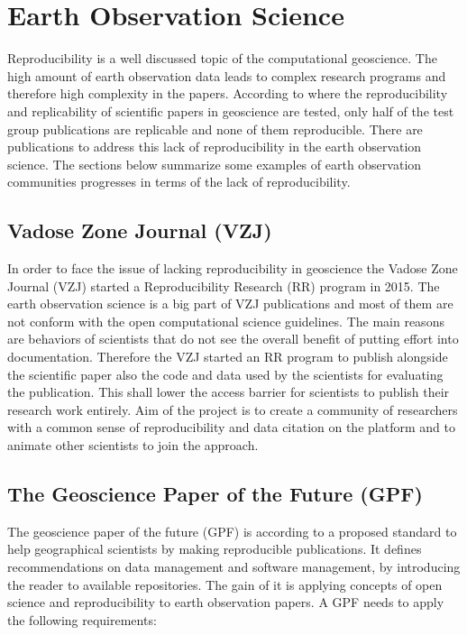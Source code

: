 \documentclass[draft,final]{vutinfth} %
\begin{document}
\section{Earth Observation Science}\label{EOScience}

Reproducibility is a well discussed topic of the computational geoscience. The high amount of earth observation data leads to complex research programs and therefore high complexity in the papers.  According to \cite{Ostermann2017AdvancingSW} where the reproducibility and replicability of scientific papers in geoscience are tested, only half of the test group publications are replicable and none of them reproducible. There are publications to address this lack of reproducibility in the earth observation science. The sections below summarize some examples of earth observation communities progresses in terms of the lack of reproducibility. 

\subsection{Vadose Zone Journal (VZJ)}\label{VZJ}
In order to face the issue of lacking reproducibility in geoscience the Vadose Zone Journal (VZJ) started a Reproducibility Research (RR) program in 2015. \cite{doi:10.2136/vzj2015.06.0088}
The earth observation science is a big part of VZJ publications and most of them are not conform with the open computational science guidelines. The main reasons are behaviors of scientists that do not see the overall benefit of putting effort into documentation. Therefore the VZJ started an RR program to publish alongside the scientific paper also the code and data used by the scientists for evaluating the publication. This shall lower the access barrier for scientists to publish their research work entirely. Aim of the project is to create a community of researchers with a common sense of reproducibility and data citation on the platform and to animate other scientists to join the approach.\cite{doi:10.2136/vzj2015.06.0088}

\subsection{The Geoscience Paper of the Future (GPF)}\label{GPF}
The geoscience paper of the future (GPF) is according to \cite{Gil2016TowardTG} a proposed standard to help geographical scientists by making reproducible publications. It defines recommendations on data management and software management, by introducing the reader to available repositories. The gain of it is applying concepts of open science and reproducibility to earth observation papers. A GPF needs to apply the following requirements:
\end{document}

